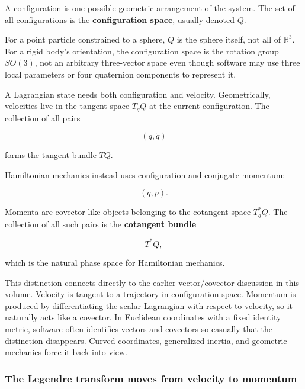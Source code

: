 \hypertarget{02-foundations-ii-ch025-configuration-space-velocity-space-and-phase-space-are-different-state-spaces}{}

A configuration is one possible geometric arrangement of the system. The set of all configurations is the \textbf{configuration space}, usually denoted \(Q\).

For a point particle constrained to a sphere, \(Q\) is the sphere itself, not all of \(\mathbb R^3\). For a rigid body's orientation, the configuration space is the rotation group \(SO(3)\), not an arbitrary three-vector space even though software may use three local parameters or four quaternion components to represent it.

A Lagrangian state needs both configuration and velocity. Geometrically, velocities live in the tangent space \(T_qQ\) at the current configuration. The collection of all pairs

\[
(q,\dot q)
\]

forms the tangent bundle \(TQ\).

Hamiltonian mechanics instead uses configuration and conjugate momentum:

\[
(q,p).
\]

Momenta are covector-like objects belonging to the cotangent space \(T_q^*Q\). The collection of all such pairs is the \textbf{cotangent bundle}

\[
\boxed{T^*Q,}
\]

which is the natural phase space for Hamiltonian mechanics.

This distinction connects directly to the earlier vector/covector discussion in this volume. Velocity is tangent to a trajectory in configuration space. Momentum is produced by differentiating the scalar Lagrangian with respect to velocity, so it naturally acts like a covector. In Euclidean coordinates with a fixed identity metric, software often identifies vectors and covectors so casually that the distinction disappears. Curved coordinates, generalized inertia, and geometric mechanics force it back into view.

\subsubsection{The Legendre transform moves from velocity to momentum}\label{02-foundations-ii-ch025-the-legendre-transform-moves-from-velocity-to-momentum}

\hypertarget{02-foundations-ii-ch025-the-legendre-transform-moves-from-velocity-to-momentum}{}

